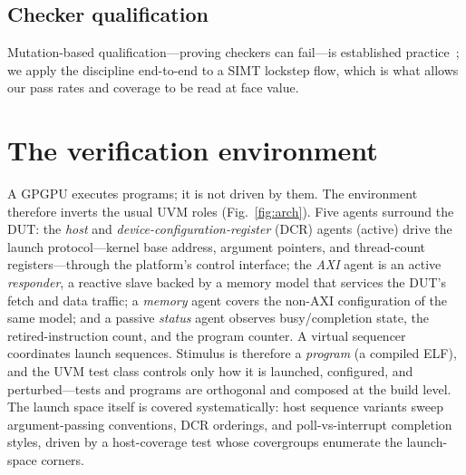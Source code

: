\documentclass[review,12pt]{elsarticle}
\begin{document}
\subsection{Checker qualification}
Mutation-based qualification---proving checkers can fail---is
established practice~\cite{vacuity-date10}; we apply the discipline
end-to-end to a SIMT lockstep flow, which is what allows our pass
rates and coverage to be read at face value.

\section{The verification environment}
\label{sec:environment}
A GPGPU executes programs; it is not driven by them. The environment
therefore inverts the usual UVM roles
(Fig.~\ref{fig:arch}). Five agents surround the DUT: the \emph{host}
and \emph{device-configuration-register} (DCR) agents (active) drive
the launch protocol---kernel base address, argument pointers, and
thread-count registers---through the platform's control interface;
the \emph{AXI} agent is an active \emph{responder}, a reactive slave
backed by a memory model that services the DUT's fetch and data
traffic; a \emph{memory} agent covers the non-AXI configuration of
the same model; and a passive \emph{status} agent observes
busy/completion state, the retired-instruction count, and the program
counter. A virtual sequencer coordinates launch sequences. Stimulus
is therefore a \emph{program} (a compiled ELF), and the UVM test
class controls only how it is launched, configured, and
perturbed---tests and programs are orthogonal and composed at the
build level. The launch space itself is covered systematically: host
sequence variants sweep argument-passing conventions, DCR orderings,
and poll-vs-interrupt completion styles, driven by a
host-coverage test whose covergroups enumerate the launch-space
corners.
\end{document}
